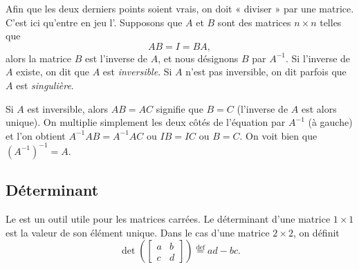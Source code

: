 Afin que les deux derniers points soient vrais, on doit « diviser » par une matrice. C'est ici qu'entre en jeu l'\emph{}. Supposons que $A$ et $B$ sont des matrices $n \times n$ telles que
\begin{equation*}
AB = I = BA ,
\end{equation*}
alors la matrice $B$ est l'inverse de $A$, et nous désignons $B$ par $A^{-1}$.
Si l'inverse de $A$ existe, on dit que $A$ est
\emph{inversible}.
Si $A$ n'est pas inversible, on dit parfois que $A$ est
\emph{singulière}.

Si $A$ est inversible, alors $AB = AC$ signifie que
$B = C$ (l'inverse de $A$ est alors unique).
On multiplie simplement les deux côtés de l'équation par $A^{-1}$ (à gauche) et l'on obtient
$A^{-1}AB = A^{-1}AC$ ou $IB=IC$ ou $B=C$.
On voit bien que ${(A^{-1})}^{-1} = A$.

\subsection{Déterminant}

Le \emph{} est un outil utile pour les matrices carrées. Le déterminant d'une matrice $1 \times 1$ est la valeur de son élément unique. Dans le cas d'une matrice $2 \times 2$, on définit
\begin{equation*}
\det \left(
\begin{bmatrix}
a & b \\
c & d
\end{bmatrix}
\right)
\overset{\text{def}}{=}
ad-bc .
\end{equation*}

